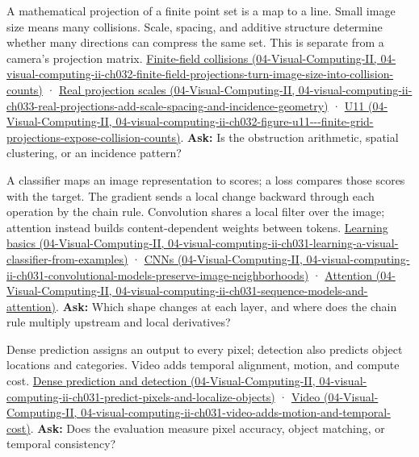 A mathematical projection of a finite point set is a map to a line. Small image size means many collisions. Scale, spacing, and additive structure determine whether many directions can compress the same set. This is separate from a camera's projection matrix. \href{../04-Visual-Computing-II/main.pdf\#nameddest=04-visual-computing-ii-ch032-finite-field-projections-turn-image-size-into-collision-counts}{Finite-field collisions (04-Visual-Computing-II, 04-visual-computing-ii-ch032-finite-field-projections-turn-image-size-into-collision-counts)} · \href{../04-Visual-Computing-II/main.pdf\#nameddest=04-visual-computing-ii-ch033-real-projections-add-scale-spacing-and-incidence-geometry}{Real projection scales (04-Visual-Computing-II, 04-visual-computing-ii-ch033-real-projections-add-scale-spacing-and-incidence-geometry)} · \href{../04-Visual-Computing-II/main.pdf\#nameddest=04-visual-computing-ii-ch032-figure-u11---finite-grid-projections-expose-collision-counts}{U11 (04-Visual-Computing-II, 04-visual-computing-ii-ch032-figure-u11-\/-\/-finite-grid-projections-expose-collision-counts)}. \textbf{Ask:} Is the obstruction arithmetic, spatial clustering, or an incidence pattern?

A classifier maps an image representation to scores; a loss compares those scores with the target. The gradient sends a local change backward through each operation by the chain rule. Convolution shares a local filter over the image; attention instead builds content-dependent weights between tokens. \href{../04-Visual-Computing-II/main.pdf\#nameddest=04-visual-computing-ii-ch031-learning-a-visual-classifier-from-examples}{Learning basics (04-Visual-Computing-II, 04-visual-computing-ii-ch031-learning-a-visual-classifier-from-examples)} · \href{../04-Visual-Computing-II/main.pdf\#nameddest=04-visual-computing-ii-ch031-convolutional-models-preserve-image-neighborhoods}{CNNs (04-Visual-Computing-II, 04-visual-computing-ii-ch031-convolutional-models-preserve-image-neighborhoods)} · \href{../04-Visual-Computing-II/main.pdf\#nameddest=04-visual-computing-ii-ch031-sequence-models-and-attention}{Attention (04-Visual-Computing-II, 04-visual-computing-ii-ch031-sequence-models-and-attention)}. \textbf{Ask:} Which shape changes at each layer, and where does the chain rule multiply upstream and local derivatives?

Dense prediction assigns an output to every pixel; detection also predicts object locations and categories. Video adds temporal alignment, motion, and compute cost. \href{../04-Visual-Computing-II/main.pdf\#nameddest=04-visual-computing-ii-ch031-predict-pixels-and-localize-objects}{Dense prediction and detection (04-Visual-Computing-II, 04-visual-computing-ii-ch031-predict-pixels-and-localize-objects)} · \href{../04-Visual-Computing-II/main.pdf\#nameddest=04-visual-computing-ii-ch031-video-adds-motion-and-temporal-cost}{Video (04-Visual-Computing-II, 04-visual-computing-ii-ch031-video-adds-motion-and-temporal-cost)}. \textbf{Ask:} Does the evaluation measure pixel accuracy, object matching, or temporal consistency?

